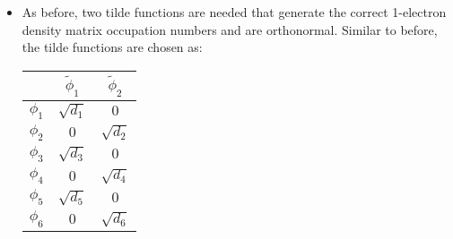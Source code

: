 \documentclass[aip,graphicx]{revtex4-1}
\begin{document}
\begin{itemize}
\begin{eqnarray}
\begin{matrix}
         0 & 0 & 0 & 0 & c_{56}^2 & 0 \\
         0 & 0 & 0 & 0 & 0 & c_{56}^2
         \end{matrix}\right) \\
         &=&
         \left(\begin{matrix}
         d_{1} & 0 & 0 & 0 & 0 & 0 \\
         0 & d_{2} & 0 & 0 & 0 & 0 \\
         0 & 0 & d_{3} & 0 & 0 & 0 \\
         0 & 0 & 0 & d_{4} & 0 & 0 \\
         0 & 0 & 0 & 0 & d_{5} & 0 \\
         0 & 0 & 0 & 0 & 0 & d_{6}
         \end{matrix}\right)
         \end{eqnarray}
         where also $d_1 = d_2$, $d_3 = d_4$, and $d_5 = d_6$.
\item As before, two tilde functions are needed that generate the correct 1-electron density matrix occupation numbers and are orthonormal. Similar to before, the tilde functions are chosen as:

         \begin{tabular}{c|cc}
               & $\tilde{\phi}_1$ & $\tilde{\phi}_2$ \\
         \hline
         $\phi_1$ & $\sqrt{d_1}$ & $0$ \\
         $\phi_2$ & $0$               & $\sqrt{d_2}$ \\
         $\phi_3$ & $\sqrt{d_3}$ & $0$ \\
         $\phi_4$ & $0$               & $\sqrt{d_4}$ \\
         $\phi_5$ & $\sqrt{d_5}$ & $0$ \\
         $\phi_6$ & $0$               & $\sqrt{d_6}$
         \end{tabular}


\end{itemize}
\end{document}
